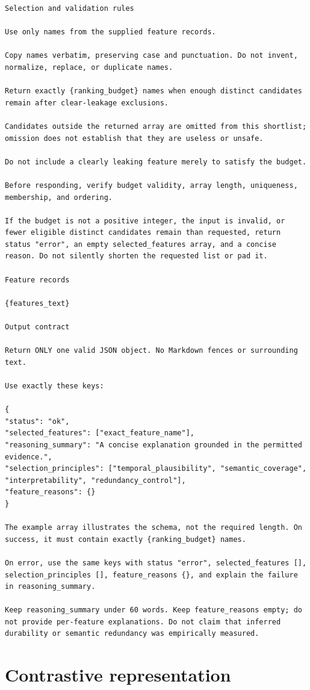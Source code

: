 \documentclass[final,5p,twocolumn]{elsarticle}
\begin{document}
\begin{lstlisting}
Selection and validation rules

Use only names from the supplied feature records.

Copy names verbatim, preserving case and punctuation. Do not invent, normalize, replace, or duplicate names.

Return exactly {ranking_budget} names when enough distinct candidates remain after clear-leakage exclusions.

Candidates outside the returned array are omitted from this shortlist; omission does not establish that they are useless or unsafe.

Do not include a clearly leaking feature merely to satisfy the budget.

Before responding, verify budget validity, array length, uniqueness, membership, and ordering.

If the budget is not a positive integer, the input is invalid, or fewer eligible distinct candidates remain than requested, return status "error", an empty selected_features array, and a concise reason. Do not silently shorten the requested list or pad it.

Feature records

{features_text}

Output contract

Return ONLY one valid JSON object. No Markdown fences or surrounding text.

Use exactly these keys:

{
"status": "ok",
"selected_features": ["exact_feature_name"],
"reasoning_summary": "A concise explanation grounded in the permitted evidence.",
"selection_principles": ["temporal_plausibility", "semantic_coverage", "interpretability", "redundancy_control"],
"feature_reasons": {}
}

The example array illustrates the schema, not the required length. On success, it must contain exactly {ranking_budget} names.

On error, use the same keys with status "error", selected_features [], selection_principles [], feature_reasons {}, and explain the failure in reasoning_summary.

Keep reasoning_summary under 60 words. Keep feature_reasons empty; do not provide per-feature explanations. Do not claim that inferred durability or semantic redundancy was empirically measured.
\end{lstlisting}

\section{Contrastive representation}
\label{app:clip}
\setcounter{table}{0}\setcounter{figure}{0}
\end{document}
